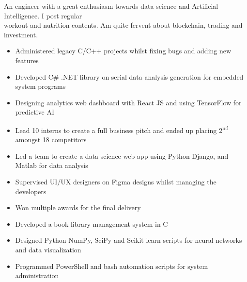 \documentclass[11pt,a4paper,ragged2e]{altacv}
\begin{document}
\begin{paracol}{2}
\smallskip
{}

An engineer with a great enthusiasm towards data science and Artificial Intelligence. I post regular \\workout and nutrition contents. Am quite fervent about blockchain, trading and investment. \smallskip

\begin{itemize}
\item Administered legacy C/C++ projects whilst fixing bugs and adding new features
\item Developed C\# .NET library on serial data analysis generation for embedded system programs
\item Designing analytics web dashboard with React JS and using TensorFlow for predictive AI 
\item Lead 10 interns to create a full business pitch and ended up placing  2\textsuperscript{nd} amongst 18 competitors
\end{itemize}
\divider

\begin{itemize}
\item Led a team to create a data science web app using Python Django, and Matlab for data analysis
\item Supervised UI/UX designers on Figma designs whilst managing the developers
\item Won multiple awards for the final delivery
\end{itemize}
\divider

\begin{itemize}
\item Developed a book library management system in C 
\item Designed Python NumPy, SciPy and Scikit-learn scripts for neural networks and data visualization
\item Programmed PowerShell and bash automation scripts for system administration
\end{itemize}
\divider


\end{paracol}
\end{document}
